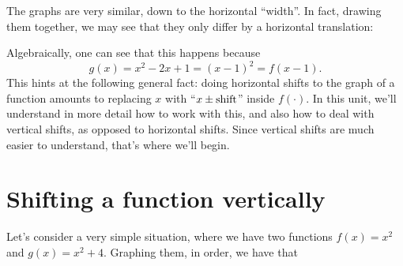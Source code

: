 \documentclass[handout, noauthor, nooutcomes]{ximera}
\begin{document}
The graphs are very similar, down to the horizontal ``width''. In fact, drawing them together, we may see that they only differ by a horizontal translation:

  \begin{image}
 \end{image}

Algebraically, one can see that this happens because $$g(x) = x^2-2x+1 = (x-1)^2 = f(x-1).$$
This hints at the following general fact: doing horizontal shifts to the graph of a function amounts to replacing $x$ with ``$x \pm {\rm shift}$'' inside $f(\cdot)$. In this unit, we'll understand in more detail how to work with this, and also how to deal with vertical shifts, as opposed to horizontal shifts. Since vertical shifts are much easier to understand, that's where we'll begin.

\section{Shifting a function vertically}

Let's consider a very simple situation, where we have two functions $f(x) = x^2$ and $g(x) = x^2+4$. Graphing them, in order, we have that

  \begin{image}
\end{image}
  \begin{image}
 \end{image}
\end{document}
